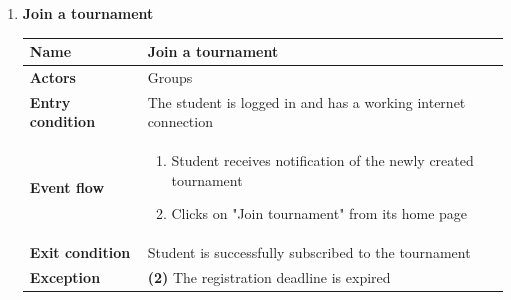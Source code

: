 \documentclass{article}
\begin{document}
\begin{enumerate}[label=\textbf{UC\arabic*}:]
\begin{center}
\begin{tabular}{ | m{8em} | m{10cm}|  }
        \end{tabular}
    \end{center}
        \item \textbf{Join a tournament}
             \begin{center}
        \begin{tabular}{ | m{8em} | m{10cm}|  } 
            \hline 
            \textbf{Name} & Join a tournament\\[1ex] 
            \hline 
            \textbf{Actors} & Groups \\[1ex] 
            \hline 
            \textbf{Entry condition} & The student is logged in and has a working internet connection \\[1ex] 
            \hline 
            \textbf{Event flow} & \begin{enumerate}[label=\textbf{\arabic*}:]
                \item Student receives notification of the newly created tournament
                \item Clicks on "Join tournament" from its home page
            \end{enumerate} \\[1ex]
            \hline 
            \textbf{Exit condition} & Student is successfully subscribed to the tournament\\[1ex]
            \hline
            \textbf{Exception} & \textbf{(2)} The registration deadline is expired\\[1ex]
            \hline 
        \end{tabular}
    \end{center}
    

\end{enumerate}
\end{document}
